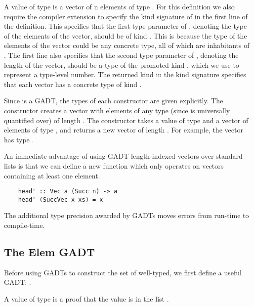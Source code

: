 
A value of type  is a vector of n elements of type . For this definition we also require the  compiler extension to specify the kind signature of  in the first line of the definition. This specifies that the first type parameter of , denoting the type of the elements of the vector, should be of kind \code{*}. This is because the type of the elements of the vector could be any concrete type, all of which are inhabitants of \code{*}. The first line also specifies that the second type parameter of , denoting the length of the vector, should be a type of the promoted kind , which we use to represent a type-level number. The returned kind \code{*} in the kind signature specifies that each vector has a concrete type of kind \code{*}.

Since  is a GADT, the types of each constructor are given explicitly. The  constructor creates a vector with elements of any type (since  is universally quantified over) of length . The  constructor takes a value of type  and a vector of  elements of type , and returns a new vector of length . For example, the vector  has type .

An immediate advantage of using GADT length-indexed vectors over standard lists is that we can define a new function  which only operates on vectors containing at least one element. 

\begin{lstlisting}
    head' :: Vec a (Succ n) -> a
    head' (SuccVec x xs) = x
\end{lstlisting}

The additional type precision awarded by GADTs moves errors from run-time to compile-time.


\subsection{The Elem GADT}

Before using GADTs to construct the set of well-typed, we first define a useful GADT: .

A value of type  is a proof that the value  is in the list . 


